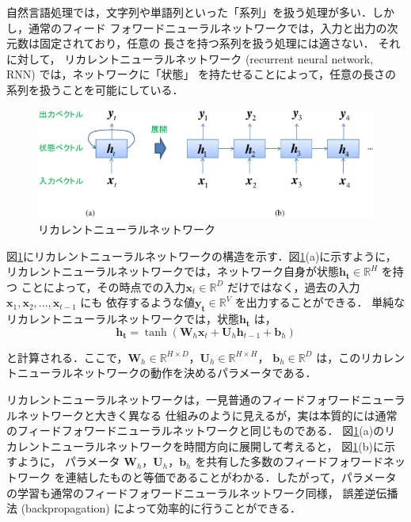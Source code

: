 自然言語処理では，文字列や単語列といった「系列」を扱う処理が多い．しかし，通常のフィード
フォワードニューラルネットワークでは，入力と出力の次元数は固定されており，任意の
長さを持つ系列を扱う処理には適さない．
それに対して，
リカレントニューラルネットワーク (recurrent neural network, RNN) では，ネットワークに「状態」
を持たせることによって，任意の長さの系列を扱うことを可能にしている．


\begin{figure}[b]
 \begin{center}
  \includegraphics[width=140mm]{images/TsuruokaLab/rnn1.eps}
 \end{center}
 \caption{リカレントニューラルネットワーク}
 \label{fig:rnn1}
\end{figure}

図\ref{fig:rnn1}にリカレントニューラルネットワークの構造を示す．図\ref{fig:rnn1}(a)に示すように，
リカレントニューラルネットワークでは，ネットワーク自身が状態$\boldsymbol{h_t} \in \mathbb{R}^H$ を持つ
ことによって，その時点での入力$\boldsymbol{x}_t \in \mathbb{R}^D$ だけではなく，過去の入力
$\boldsymbol{x}_1,\boldsymbol{x}_2,...,\boldsymbol{x}_{t-1}$ にも
依存するような値$\boldsymbol{y_t} \in \mathbb{R}^V$ を出力することができる．
単純なリカレントニューラルネットワークでは，状態$\boldsymbol{h_t}$ は，
\begin{equation}
\boldsymbol{h_t} = \tanh(\boldsymbol{W}_h \boldsymbol{x}_{t} + \boldsymbol{U}_h \boldsymbol{h}_{t-1} + \boldsymbol{b}_h)
\end{equation}

\noindent
と計算される．ここで，$\boldsymbol{W}_h \in \mathbb{R}^{H \times D}$，$\boldsymbol{U}_h \in \mathbb{R}^{H \times H}$，
$\boldsymbol{b}_h \in \mathbb{R}^D$ は，このリカレントニューラルネットワークの動作を決めるパラメータである．

リカレントニューラルネットワークは，一見普通のフィードフォワードニューラルネットワークと大きく異なる
仕組みのように見えるが，実は本質的には通常のフィードフォワードニューラルネットワークと同じものである．
図\ref{fig:rnn1}(a)のリカレントニューラルネットワークを時間方向に展開して考えると，
図\ref{fig:rnn1}(b)に示すように，
パラメータ $\boldsymbol{W}_h$，$\boldsymbol{U}_h$，$\boldsymbol{b}_h$ を共有した多数のフィードフォワードネットワーク
を連結したものと等価であることがわかる．したがって，パラメータの学習も通常のフィードフォワードニューラルネットワーク同様，
誤差逆伝播法 (backpropagation) によって効率的に行うことができる．


